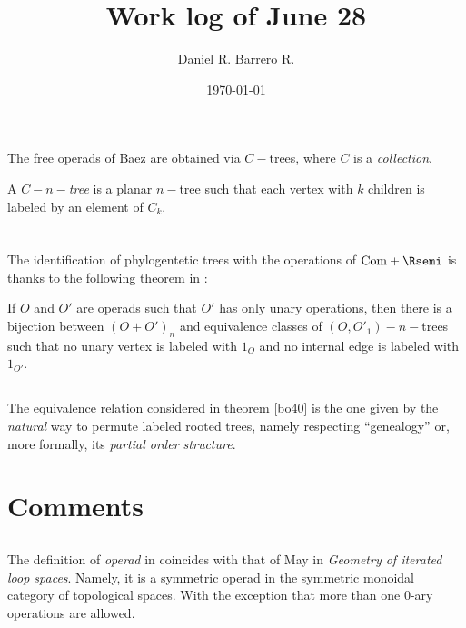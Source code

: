 \documentclass{amsart}
\title{Work log of June 28}
\author{Daniel R. Barrero R.}
\date{\today}
\begin{document}
\maketitle

\section{}

The free operads of Baez are obtained via $C-$trees, where $C$ is a
\emph{collection}.

\begin{defn}
	A \emph{$C-n-$tree} is a planar $n-$tree such that each vertex
	with $k$ children is labeled by an element of $C_k$.
\end{defn}

\section{}

The identification of phylogentetic trees with the operations of
$\mathrm{Com} + \Rsemi$ is thanks to the following theorem in
\cite{baezOtter}:

\begin{thm}\label{bo40}
	If $O$ and $O'$ are operads such that $O'$ has only unary
	operations, then there is a bijection between $(O + O')_n$ and
	equivalence classes of $(O,O'_1)-n-$trees such that no unary vertex
	is labeled with $1_O$ and no internal edge is labeled with
	$1_{O'}$.
\end{thm}

\subsection{} The equivalence relation considered in theorem \ref{bo40} is
the one given by the \emph{natural} way to permute labeled rooted trees,
namely respecting ``genealogy'' or, more formally, its \emph{partial order
structure}.


\section{Comments}

\subsection{} The definition of \emph{operad} in \cite{baezOtter}
coincides with that of May in \emph{Geometry of iterated loop spaces}.
Namely, it is a symmetric operad in the symmetric monoidal category of
topological spaces. With the exception that more than one 0-ary operations
are allowed.
\end{document}
